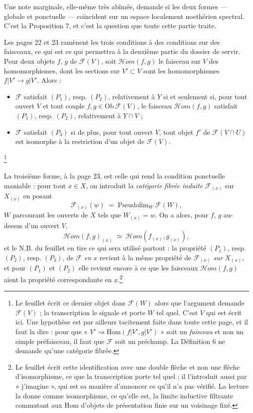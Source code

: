 \documentclass[11pt,a4paper]{article}
\begin{document}
Une note marginale, elle-même très abîmée, demande si les deux formes — globale
et ponctuelle — coïncident sur un espace localement noethérien spectral. C'est
la Proposition 7, et c'est la question que toute cette partie traite.

Les pages 22 et 23 ramènent les trois conditions à des conditions sur des
faisceaux, ce qui est ce qui permettra à la deuxième partie du dossier de servir.
Pour deux objets $f$, $g$ de $\mathcal{F}(V)$, soit $\mathcal{H}om(f,g)$ le
faisceau sur $V$ des homomorphismes, dont les sections sur $V' \subset V$ sont
les homomorphismes $f|V' \to g|V'$. Alors :
\begin{itemize}
  \item $\mathcal{F}$ satisfait $(P_{1})$, resp. $(P_{2})$, relativement à $Y$
  si et seulement si, pour tout ouvert $V$ et tout couple
  $f, g \in \mathrm{Ob}\,\mathcal{F}(V)$, le faisceau $\mathcal{H}om(f,g)$
  satisfait $(P_{1})$, resp. $(P_{2})$, relativement à $Y \cap V$ ;
  \item $\mathcal{F}$ satisfait $(P_{3})$ si de plus, pour tout ouvert $V$, tout
  objet $f'$ de $\mathcal{F}(V \cap U)$ est isomorphe à la restriction d'un objet
  de $\mathcal{F}(V)$.
\end{itemize}

\footnote{Le feuillet écrit ce dernier objet dans $\mathcal{F}(W)$ alors que
l'argument demande $\mathcal{F}(V)$ ; la transcription le signale et porte $W$
tel quel. C'est $V$ qui est écrit ici. Une hypothèse est par ailleurs
tacitement faite dans toute cette page, et il faut la dire : pour que
« $V' \rightsquigarrow \mathrm{Hom}(f|V', g|V')$ » soit un \emph{faisceau} et
non un simple préfaisceau, il faut que $\mathcal{F}$ soit un préchamp. La
Définition 6 ne demande qu'une catégorie fibrée.}

La troisième forme, à la page 23, est celle qui rend la condition ponctuelle
maniable : pour tout $x \in X$, on introduit la \emph{catégorie fibrée induite}
$\mathcal{F}_{(x)}$ sur $X_{(x)}$ en posant
\[
  \mathcal{F}_{(x)}(w) \;=\; \mathrm{Pseudolim}_{W}\ \mathcal{F}(W) ,
\]
$W$ parcourant les ouverts de $X$ tels que $W_{(x)} = w$. On a alors, pour $f$,
$g$ au-dessus d'un ouvert $V$,
\[
  \mathcal{H}om(f,g)_{(x)} \;\simeq\; \mathcal{H}om(f_{(x)}, g_{(x)}) ,
\]
et le N.B. du feuillet en tire ce qui sera utilisé partout : la propriété
$(P_{1})$, resp. $(P_{2})$, resp. $(P_{3})$, de $\mathcal{F}$ \emph{en} $x$
revient à la même propriété de $\mathcal{F}_{(x)}$ \emph{sur} $X_{(x)}$, et pour
$(P_{1})$ et $(P_{2})$ elle revient encore à ce que les faisceaux
$\mathcal{H}om(f,g)$ aient la propriété correspondante en $x$.\footnote{Le
feuillet écrit cette identification avec une double flèche et non une flèche
d'isomorphisme, ce que la transcription porte tel quel ; il l'introduit aussi
par « j'imagine », qui est sa manière d'annoncer ce qu'il n'a pas vérifié. La
lecture la donne comme isomorphisme, ce qu'elle est, la limite inductive
filtrante commutant aux Hom d'objets de présentation finie sur un voisinage
fixé.}
\end{document}
